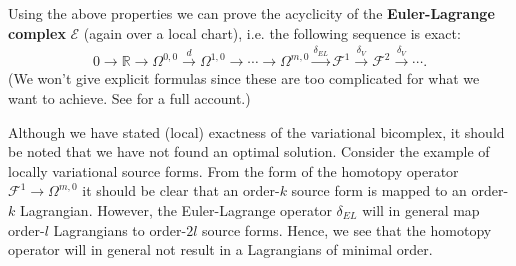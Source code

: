     Using the above properties we can prove the acyclicity of the \textbf{Euler-Lagrange complex} $\mathcal{E}$ (again over a local chart), i.e. the following sequence is exact:
    \begin{gather}
        0\longrightarrow\mathbb{R}\longrightarrow\Omega^{0,0}\xrightarrow{\ d\ }\Omega^{1,0}\longrightarrow\cdots\longrightarrow\Omega^{m,0}\xrightarrow{\delta_{EL}}\mathcal{F}^1\xrightarrow{\,\delta_V\,}\mathcal{F}^2\xrightarrow{\,\delta_V\,}\cdots.
    \end{gather}
    (We won't give explicit formulas since these are too complicated for what we want to achieve. See \cite{var_bicomplex} for a full account.)

    \begin{remark}
        Although we have stated (local) exactness of the variational bicomplex, it should be noted that we have not found an optimal solution. Consider the example of locally variational source forms. From the form of the homotopy operator $\mathcal{F}^1\rightarrow\Omega^{m,0}$ it should be clear that an order-$k$ source form is mapped to an order-$k$ Lagrangian. However, the Euler-Lagrange operator $\delta_{EL}$ will in general map order-$l$ Lagrangians to order-$2l$ source forms. Hence, we see that the homotopy operator will in general not result in a Lagrangians of minimal order.
    \end{remark}

